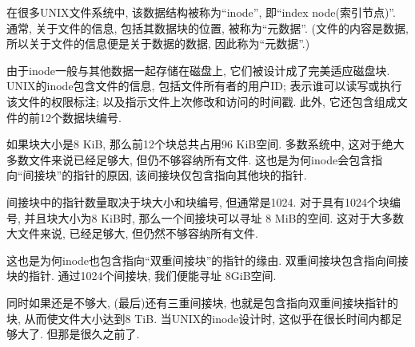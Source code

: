\documentclass[12pt]{book}
\begin{document}
{在很多UNIX文件系统中, 该数据结构被称为``inode'', 即``index node(索引节点)''.
通常, 关于文件的信息, 包括其数据块的位置, 被称为``元数据''.
(文件的内容是数据, 所以关于文件的信息便是关于数据的数据, 因此称为``元数据''.)

%
由于inode一般与其他数据一起存储在磁盘上, 它们被设计成了完美适应磁盘块.
UNIX的inode包含文件的信息, 包括文件所有者的用户ID; 
表示谁可以读写或执行该文件的权限标注; 以及指示文件上次修改和访问的时间戳.
此外, 它还包含组成文件的前12个数据块编号.

如果块大小是8 KiB, 那么前12个块总共占用96 KiB空间.
多数系统中, 这对于绝大多数文件来说已经足够大,
但仍不够容纳所有文件.
这也是为何inode会包含指向``间接块''的指针的原因,
该间接块仅包含指向其他块的指针.


%
间接块中的指针数量取决于块大小和块编号, 但通常是1024.
对于具有1024个块编号, 并且块大小为8 KiB时, 那么一个间接块可以寻址
8 MiB的空间. 这对于大多数大文件来说, 已经足够大, 但仍然不够容纳所有文件.

这也是为何inode也包含指向``双重间接块''的指针的缘由.
双重间接块包含指向间接块的指针. 通过1024个间接块, 我们便能寻址 8GiB空间.


%
同时如果还是不够大, (最后)还有三重间接块, 也就是包含指向双重间接块指针的块,
从而使文件大小达到8 TiB. 当UNIX的inode设计时, 这似乎在很长时间内都足够大了.
但那是很久之前了.

}
\end{document}
